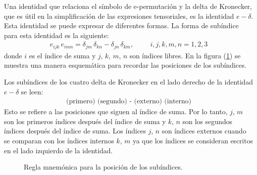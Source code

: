 \documentclass[hidelinks,12pt]{article}
\begin{document}
Una identidad que relaciona el símbolo de e-permutación y la delta de Kronecker, que es útil en la simplificación de las expresiones tensoriales, es la identidad $e-\delta$. Esta identidad se puede expresar de diferentes formas. La forma de subíndice para esta identidad es la siguiente:
\begin{align*}
e_{ijk} \, e_{imn} = \delta_{jm} \, \delta_{kn} - \delta_{jn} \, \delta_{km}, \hspace{1cm} i, j, k, m, n = 1, 2, 3
\end{align*}
donde $i$ es el índice de suma y $j$, $k$, $m$, $n$ son índices libres. En la figura (\ref{fig:figura_01_03}) se muestra una manera esquemática para recordar las posiciones de los subíndices.
\par
Los subíndices de los cuatro delta de Kronecker en el lado derecho de la identidad $e-\delta$ se leen:
\begin{align*}
\mbox{(primero) (segundo) - (externo) (interno)}
\end{align*}
Esto se refiere a las posiciones que siguen al índice de suma. Por lo tanto, $j$, $m$ son los primeros índices después del índice de suma y $k$, $n$ son los segundos índices después del índice de suma. Los índices $j$, $n$ son índices externos cuando se comparan con los índices internos $k$, $m$ ya que los índices se consideran escritos en el lado izquierdo de la identidad.
\begin{figure}[H]
    \centering
    \caption{Regla mnemónica para la posición de los subíndices.}
    \label{fig:figura_01_03}
\end{figure}
\end{document}
